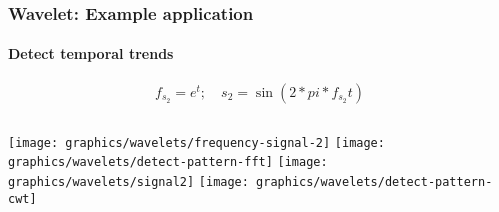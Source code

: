     \begin{frame}
        \frametitle{Wavelet: Example application}
        \framesubtitle{Detect temporal trends}
        $$f_{s_2} = e^t;\quad s_2 = \sin\left(2*pi*f_{s_2}t\right)$$
        \begin{columns}[onlytextwidth]
             {
                \texttt{[image: graphics/wavelets/frequency-signal-2]}
            }
             {
                \texttt{[image: graphics/wavelets/detect-pattern-fft]}
            }
             {
                \texttt{[image: graphics/wavelets/signal2]}
            }
             {
                \texttt{[image: graphics/wavelets/detect-pattern-cwt]}
            }
        \end{columns}
        
    \end{frame}

